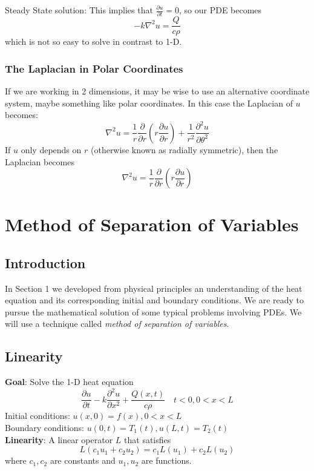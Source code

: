 \documentclass{article}
\begin{document}
	Steady State solution: This implies that $ \frac{\partial u}{\partial t} = 0 $, so our PDE becomes
	\[
		-k\nabla^2 u = \frac{Q}{c\rho}
	\]
	which is not so easy to solve in contrast to 1-D.
	
	\subsubsection*{The Laplacian in Polar Coordinates}
	
	If we are working in 2 dimensions, it may be wise to use an alternative coordinate system, maybe something like polar coordinates. In this case the Laplacian of $ u $ becomes:
	\[
		\nabla^2 u = \frac{1}{r} \frac{\partial}{\partial r} \left( r \frac{\partial u}{\partial r} \right) + \frac{1}{r^2} \frac{\partial^2 u}{\partial \theta^2}
	\]
	If $ u $ only depends on $ r $ (otherwise known as radially symmetric), then the Laplacian becomes
	\[
		\nabla^2 u = \frac{1}{r} \frac{\partial}{\partial r} \left( r \frac{\partial u}{\partial r} \right)
	\]

	\section{Method of Separation of Variables}
	
	\subsection{Introduction}
	
	In Section 1 we developed from physical principles an understanding of the heat equation and its corresponding initial and boundary conditions. We are ready to pursue the mathematical solution of some typical problems involving PDEs. We will use a technique called \textit{method of separation of variables}.
	
	\subsection{Linearity}
	
	\textbf{Goal}: Solve the 1-D heat equation
	\[
		\frac{\partial u}{\partial t} - k\frac{\partial^2 u}{\partial x^2} + \frac{Q(x,t)}{c\rho} \quad t<0, 0<x<L
	\]
	Initial conditions: $ u(x,0) = f(x), 0<x<L $ \vspace{1mm} \\
	Boundary conditions: $ u(0,t) = T_1(t), u(L,t) = T_2(t) $ \\ 
	
	\textbf{Linearity}: A linear operator $ L $ that satisfies
	\[
		L(c_1 u_1 + c_2 u_2) = c_1 L(u_1) + c_2 L(u_2)
	\]
	where $ c_1, c_2 $ are constants and $ u_1,u_2 $ are functions. \\
	
\end{document}

